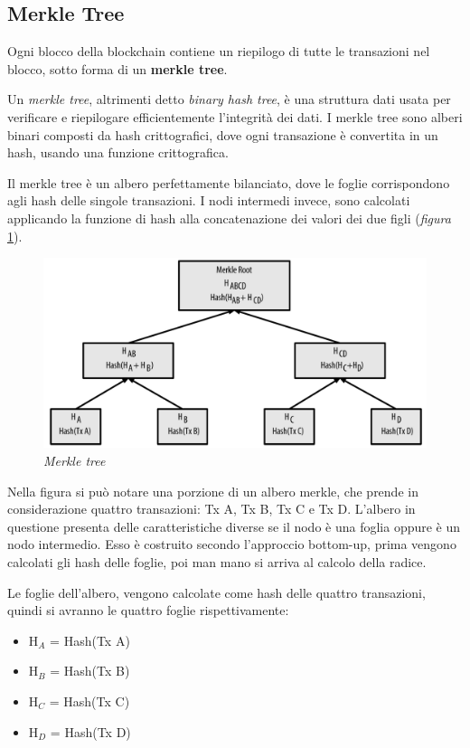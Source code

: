 \subsection{Merkle Tree}

Ogni blocco della blockchain contiene un riepilogo di tutte le transazioni nel blocco, sotto forma di un \textbf{merkle tree}.

Un \textit{merkle tree}, altrimenti detto \textit{binary hash tree}, è una struttura dati usata per verificare e riepilogare efficientemente l'integrità dei dati. I merkle tree sono alberi binari composti da hash crittografici, dove ogni transazione è convertita in un hash, usando una funzione crittografica.

Il merkle tree è un albero perfettamente bilanciato, dove le foglie corrispondono agli hash delle singole transazioni. I nodi intermedi invece, sono calcolati applicando la funzione di hash alla concatenazione dei valori dei due figli (\textit{figura} \ref{fig:merkletree}).

\begin{figure}[htbp]
	\centering
	\includegraphics[width= 0.5 \linewidth]{figure/merkletree}
	\caption{\textit{Merkle tree} \label{fig:merkletree}}
\end{figure}

Nella figura si può notare una porzione di un albero merkle, che prende in considerazione quattro transazioni: Tx A, Tx B, Tx C e Tx D. L'albero in questione presenta delle caratteristiche diverse se il nodo è una foglia oppure è un nodo intermedio. Esso è costruito secondo l'approccio bottom-up, prima vengono calcolati gli hash delle foglie, poi man mano si arriva al calcolo della radice.

Le foglie dell'albero, vengono calcolate come hash delle quattro transazioni, quindi si avranno le quattro foglie rispettivamente: 
\begin{itemize}
	\item H$_A$ = Hash(Tx A)
	\item H$_B$ = Hash(Tx B)
	\item H$_C$ = Hash(Tx C)
	\item H$_D$ = Hash(Tx D)
\end{itemize}

